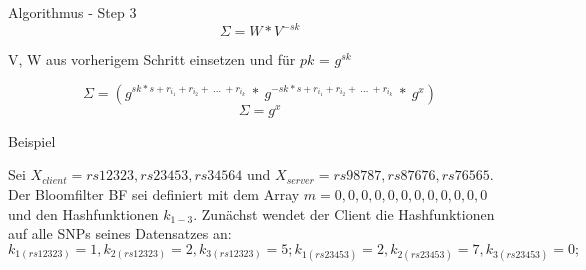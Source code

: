 \documentclass{beamer}
\begin{document}
	
	\begin{frame}{Algorithmus - Step 3}
		$$\Sigma = W * V^{-sk}$$
		\begin{arrowlist}
			\item V, W aus vorherigem Schritt einsetzen und für $pk$ = $g^{sk}$ 
		\end{arrowlist}
		\vskip 0.1cm 
		
		$$\Sigma = (g^{sk * s + r_{i_{1}} + r_{i_{2}} + \ ...\ +r_{i_{k}}} \ * \ g^{-sk * s + r_{i_{1}} + r_{i_{2}} + \ ...\ +r_{i_{k}}} \ * \ g^x) $$
		$$\Sigma = g^x$$
	\end{frame}

\begin{frame}{Beispiel}
	
	Sei $ X_{client} = {rs12323, rs23453, rs34564} $ und $ X_{server} = {rs98787, rs87676, rs76565}  $. Der Bloomfilter BF sei definiert mit dem Array $ m = {0,0,0,0,0,0,0,0,0,0,0,0}  $ und den Hashfunktionen $ k_{1-3} $.
	Zunächst wendet der Client die Hashfunktionen auf alle SNPs seines Datensatzes an: $ k_{1 (rs12323)} =1 ,k_{2 (rs12323)} = 2 , k_{3 (rs12323)} = 5; k_{1 (rs23453)} =2 ,k_{2 (rs23453)} = 7 , k_{3 (rs23453)} = 0; $
	
	 
\end{frame}
\end{document}
